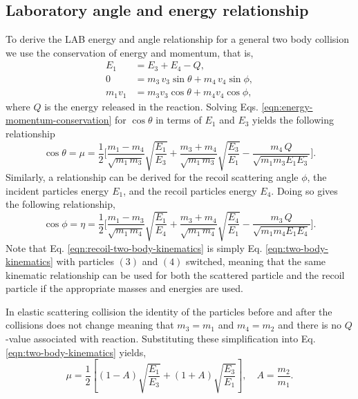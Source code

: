 \subsection{Laboratory angle and energy relationship}
To derive the LAB energy and angle relationship for a general two body collision we use the conservation of energy and momentum, that is,
\begin{subequations} \label{eqn:energy-momentum-conservation}
\begin{align}
  E_{1} &= E_{3} + E_{4} - Q, \\
  0 &= m_{3} \, v_{3} \sin \theta + m_{4} \, v_{4} \sin \phi, \\
  m_{1} v_{1} &= m_{3} v_{3} \cos \theta + m_{4} v_{4} \cos \phi,
\end{align}
\end{subequations}
where $Q$ is the energy released in the reaction. Solving Eqs. \eqref{eqn:energy-momentum-conservation} for $\cos \theta$ in terms of $E_{1}$ and $E_{3}$ yields the following relationship
\begin{equation} \label{eqn:two-body-kinematics}
  \cos \theta = \mu = \dfrac{1}{2} \Bigg[\frac{m_{1} - m_{4}}{\sqrt{m_{1} \, m_{3}}}\sqrt{\dfrac{E_{1}}{E_{3}}} + \frac{m_{3} + m_{4}}{\sqrt{m_{1} \, m_{3}}}\sqrt{\dfrac{E_{3}}{E_{1}}} - \dfrac{m_{4} \, Q}{\sqrt{m_{1} m_{3} E_{1} E_{3}}}\Bigg].
\end{equation}
Similarly, a relationship can be derived for the recoil scattering angle $\phi$, the incident particles energy $E_1$, and the recoil particles energy $E_4$. Doing so gives the following relationship,
\begin{equation} \label{eqn:recoil-two-body-kinematics}
  \cos \phi = \eta = \dfrac{1}{2} \Bigg[\frac{m_{1} - m_{3}}{\sqrt{m_{1} \, m_{4}}}\sqrt{\dfrac{E_{1}}{E_{4}}} + \frac{m_{3} + m_{4}}{\sqrt{m_{1} \, m_{4}}}\sqrt{\dfrac{E_{4}}{E_{1}}} - \dfrac{m_{3} \, Q}{\sqrt{m_{1} m_{4} E_{1} E_{4}}}\Bigg].
\end{equation}
Note that Eq. \eqref{eqn:recoil-two-body-kinematics} is simply Eq. \eqref{eqn:two-body-kinematics} with particles $(3)$ and $(4)$ switched, meaning that the same kinematic relationship can be used for both the scattered particle and the recoil particle if the appropriate masses and energies are used.

In elastic scattering collision the identity of the particles before and after the collisions does not change meaning that $m_{3} = m_{1}$ and $m_{4} = m_{2}$ and there is no $Q$-value associated with reaction. Substituting these simplification into Eq. \eqref{eqn:two-body-kinematics} yields,
\begin{equation} \label{eqn:elastic-scattering-angle-energy-rel}
  \mu = \dfrac{1}{2} \left[\left(1 - A\right)\sqrt{\dfrac{E_{1}}{E_{3}}} + \left(1 + A\right)\sqrt{\dfrac{E_{3}}{E_{1}}}\right], \quad A = \dfrac{m_{2}}{m_{1}}.
\end{equation}

